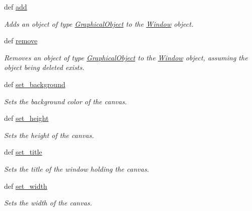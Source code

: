 \begin{DoxyCompactItemize}
\item 
def \hyperlink{classcs110graphics_1_1Window_a34064de02d5149841a23764e78085d18}{add}
\begin{DoxyCompactList}\small\item\em Adds an object of type \hyperlink{classcs110graphics_1_1GraphicalObject}{GraphicalObject} to the \hyperlink{classcs110graphics_1_1Window}{Window} object. \item\end{DoxyCompactList}\item 
def \hyperlink{classcs110graphics_1_1Window_a14aba875d32f8a70a0c5a80ac3f18a92}{remove}
\begin{DoxyCompactList}\small\item\em Removes an object of type \hyperlink{classcs110graphics_1_1GraphicalObject}{GraphicalObject} to the \hyperlink{classcs110graphics_1_1Window}{Window} object, assuming the object being deleted exists. \item\end{DoxyCompactList}\item 
def \hyperlink{classcs110graphics_1_1Window_a981a3115f1f22099549117313f38333c}{set\_\-background}
\begin{DoxyCompactList}\small\item\em Sets the background color of the canvas. \item\end{DoxyCompactList}\item 
def \hyperlink{classcs110graphics_1_1Window_a9b548549f8f09ca3f29e6e80483e21d2}{set\_\-height}
\begin{DoxyCompactList}\small\item\em Sets the height of the canvas. \item\end{DoxyCompactList}\item 
def \hyperlink{classcs110graphics_1_1Window_a227c806c2acbcaca9958ba3b610a85f6}{set\_\-title}
\begin{DoxyCompactList}\small\item\em Sets the title of the window holding the canvas. \item\end{DoxyCompactList}\item 
def \hyperlink{classcs110graphics_1_1Window_a55036373bfb4437eb4368a39fedb8722}{set\_\-width}
\begin{DoxyCompactList}\small\item\em Sets the width of the canvas. \item\end{DoxyCompactList}\end{DoxyCompactItemize}


